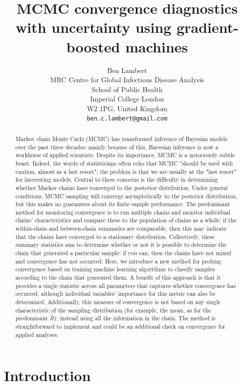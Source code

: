 \documentclass{article}
\title{MCMC convergence diagnostics with uncertainty using gradient-boosted machines}
\author{%
	 Ben Lambert\\
	 MRC Centre for Global Infectious Disease Analysis\\
	 School of Public Health\\
	 Imperial College London\\
	 W2 1PG, United Kingdom\\
	 \texttt{ben.c.lambert@gmail.com} \\
}
\begin{document}

\maketitle

\begin{abstract}
	Markov chain Monte Carlo (MCMC) has transformed inference of Bayesian models over the past three decades: mainly because of this, Bayesian inference is now a workhorse of applied scientists. Despite its importance, MCMC is a notoriously subtle beast. Indeed, the words of statisticians often echo that MCMC "should be used with caution, almost as a last resort"; the problem is that we are usually at the "last resort" for interesting models. Central to these concerns is the difficulty in determining whether Markov chains have converged to the posterior distribution. Under general conditions, MCMC sampling will converge asymptotically to the posterior distribution, but this makes no guarantees about its finite sample performance. The predominant method for monitoring convergence is to run multiple chains and monitor individual chains' characteristics and compare these to the population of chains as a whole: if the within-chain and between-chain summaries are comparable, then this may indicate that the chains have converged to a stationary distribution. Collectively, these summary statistics aim to determine whether or not it is possible to determine the chain that generated a particular sample: if you can, then the chains have not mixed and convergence has not occurred. Here, we introduce a new method for probing convergence based on training machine learning algorithms to classify samples according to the chain that generated them. A benefit of this approach is that it provides a single statistic across all parameters that captures whether convergence has occurred, although individual variables' importance for this metric can also be determined. Additionally, this measure of convergence is not based on any single characteristic of the sampling distribution (for example, the mean, as for the predominant $\hat{R}$); instead using all the information in the chain. The method is straightforward to implement and could be an additional check on convergence for applied analyses.
\end{abstract}

\section{Introduction}
\end{document}

